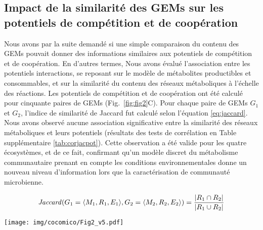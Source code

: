 \subsection{Impact de la similarité des GEMs sur les potentiels de compétition et de coopération} Nous avons par la suite demandé si une simple comparaison du contenu des GEMs pouvait donner des informations similaires aux potentiels de compétition et de coopération. En d'autres termes, Nous avons évalué l'association entre les potentiels interactions, se reposant sur le modèle de métabolites productibles et consommables, et sur la similarité du contenu des réseaux métaboliques à l'échelle des réactions. Les potentiels de compétition et de coopération ont été calculé pour cinquante paires de GEMs (Fig.~\ref{fig:fig2}C). Pour chaque paire de GEMs $G_1$ et $G_2$, l'indice de similarité de Jaccard fut calculé selon l'équation \ref{eq:jaccard}. Nous avons observé aucune association significative entre la similarité des réseaux métaboliques et leurs potentiels (résultats des tests de corrélation en Table supplémentaire \ref{tab:corjacpot}). Cette observation a été valide pour les quatre écosystèmes, et de ce fait, confirmant qu'un modèle discret du métabolisme communautaire prenant en compte les conditions environnementales donne un nouveau niveau d'information lors que la caractérisation de communauté microbienne.

\begin{equation*}
\label{eq:jaccard}
    \mbox{\textit{Jaccard}}(G_1=\langle M_1, R_1, E_1\rangle, G_2=\langle M_2, R_2, E_2\rangle) = 
    \frac{\vert R_1 \cap R_2 \vert}{\vert R_1 \cup R_2 \vert}
\end{equation*}


\begin{figure*}[ht]
    \centering
    \texttt{[image: img/cocomico/Fig2\_v5.pdf]}
    \caption{\textbf{Cooperation and competition potentials in diverse ecosystems.}
    (\textbf{A.}) Distribution of cooperation and competition potentials in simulated communities composed of 5 to 150 cultivable bacteria isolated in the human gut, the leaf, roots or soil.
    (\textbf{B.}) Results of Kruskal-Wallis tests (Chi$^2$, adjusted $P$-value symbols) comparing cooperation and competition potentials across communities of panel A and artificial communities mixing bacteria from all ecosystems (``mix''). 
    (*) Adjusted $P$-values (Benjamini-Hochberg): $P < 0.05$,
    (**) Adjusted $P$-values (Benjamini-Hochberg): $P < 0.01$,
    (***) Adjusted $P$-values (Benjamini-Hochberg): $P < 0.001$.
    (\textbf{C.}) Jaccard similarity indices and competition/cooperation potentials of pairs of GSMNs from the four ecosystems. Lines are linear models drawn for each ecosystem.
    (\textbf{D.}) Effect on the cooperation and competition potentials of removing one (``1 removed'') or adding one (``1 added'') community member, according to the community size.}
    \label{fig:fig2}
\end{figure*}

